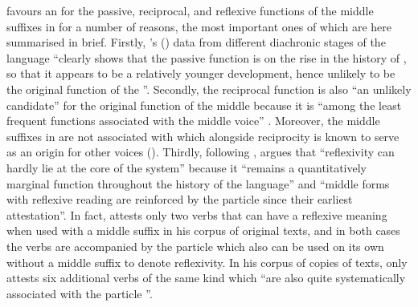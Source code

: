 \cite{inglese:2020} favours an  for the passive, reciprocal, and reflexive functions of the middle suffixes in  for a number of reasons, the most important ones of which are here summarised in brief. Firstly, \citeauthor{inglese:2020}’s (\citeyear[231]{inglese:2020}) data from different diachronic stages of the  language “clearly shows that the passive function is on the rise in the history of , so that it appears to be a relatively younger development, hence unlikely to be the original function of the ”. Secondly, the reciprocal function is also “an unlikely candidate” for the original function of the middle because it is “among the least frequent functions associated with the middle voice” \citep[230]{inglese:2020}. Moreover, the middle suffixes in  are not associated with  which alongside reciprocity is known to serve as an origin for other voices (). Thirdly, following \cite{luraghi:2010, luraghi:2012}, \cite[230]{inglese:2020} argues that “reflexivity can hardly lie at the core of the   system” because it “remains a quantitatively marginal function throughout the history of the language” and “middle forms with reflexive reading are reinforced by the particle  since their earliest attestation”. In fact, \cite[83, 147]{inglese:2020} attests only two verbs that can have a reflexive meaning when used with a middle suffix in his corpus of original  texts, and in both cases the verbs are accompanied by the particle  which also can be used on its own without a middle suffix to denote reflexivity. In his corpus of copies of  texts, \cite[148]{inglese:2020} only attests six additional verbs of the same kind which “are also quite systematically associated with the particle ”. 

